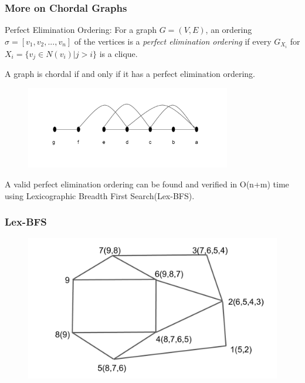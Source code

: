 \documentclass{beamer}
\begin{document}
\begin{frame}
	\frametitle{More on Chordal Graphs}
	
    Perfect Elimination Ordering: For a graph $G = (V, E)$, an ordering $ \sigma = [v_1, v_2, ..., v_n] $ of the vertices is a \emph{perfect elimination ordering} if every $ G_{X_i} $ for $ X_i = \{v_{j} \in N( v_{i} )|j>i\} $ is a clique.
    
    \vspace{0.1in}
    
    A graph is chordal if and only if it has a perfect elimination ordering.

	\begin{figure}
		\includegraphics[width = 0.8\textwidth]{figures/peo.pdf}
	\end{figure}
	
	A valid perfect elimination ordering can be found and verified in O(n+m) time using Lexicographic Breadth First Search(Lex-BFS).
	
\end{frame}

\begin{frame}
	\frametitle{Lex-BFS}
	\begin{figure}
		\includegraphics[width = 1\textwidth]{figures/lex_illu1.pdf}
	\end{figure}
	
\vspace{0.2in}
\end{frame}
\end{document}
